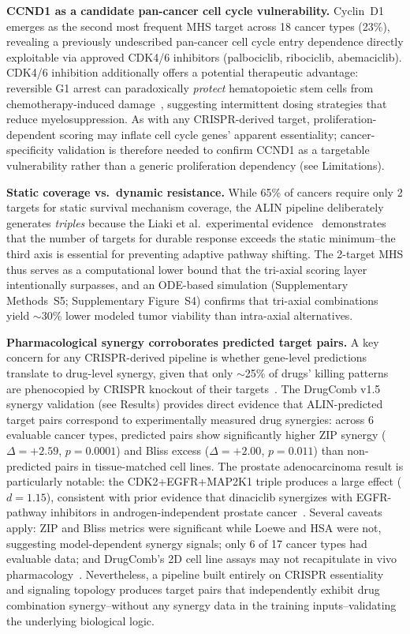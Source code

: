 \documentclass[times, twoside, watermark]{zHenriquesLab-StyleBioRxiv}
\begin{document}
\textbf{CCND1 as a candidate pan-cancer cell cycle vulnerability.} Cyclin~D1 emerges as the second most frequent MHS target across 18 cancer types (23\%), revealing a previously undescribed pan-cancer cell cycle entry dependence directly exploitable via approved CDK4/6 inhibitors (palbociclib, ribociclib, abemaciclib). CDK4/6 inhibition additionally offers a potential therapeutic advantage: reversible G1 arrest can paradoxically \emph{protect} hematopoietic stem cells from chemotherapy-induced damage~\cite{Roberts2012}, suggesting intermittent dosing strategies that reduce myelosuppression. As with any CRISPR-derived target, proliferation-dependent scoring may inflate cell cycle genes' apparent essentiality; cancer-specificity validation is therefore needed to confirm CCND1 as a targetable vulnerability rather than a generic proliferation dependency (see Limitations).

\textbf{Static coverage vs.\ dynamic resistance.} While 65\% of cancers require only 2 targets for static survival mechanism coverage, the ALIN pipeline deliberately generates \emph{triples} because the Liaki et al.\ experimental evidence~\cite{Liaki2025} demonstrates that the number of targets for durable response exceeds the static minimum--the third axis is essential for preventing adaptive pathway shifting. The 2-target MHS thus serves as a computational lower bound that the tri-axial scoring layer intentionally surpasses, and an ODE-based simulation (Supplementary Methods~S5; Supplementary Figure~S4) confirms that tri-axial combinations yield $\sim$30\% lower modeled tumor viability than intra-axial alternatives.

\textbf{Pharmacological synergy corroborates predicted target pairs.} A key concern for any CRISPR-derived pipeline is whether gene-level predictions translate to drug-level synergy, given that only $\sim$25\% of drugs' killing patterns are phenocopied by CRISPR knockout of their targets~\cite{Lin2017,Goncalves2020}. The DrugComb v1.5 synergy validation (see Results) provides direct evidence that ALIN-predicted target pairs correspond to experimentally measured drug synergies: across 6 evaluable cancer types, predicted pairs show significantly higher ZIP synergy ($\Delta = +2.59$, $p = 0.0001$) and Bliss excess ($\Delta = +2.00$, $p = 0.011$) than non-predicted pairs in tissue-matched cell lines. The prostate adenocarcinoma result is particularly notable: the CDK2+EGFR+MAP2K1 triple produces a large effect ($d = 1.15$), consistent with prior evidence that dinaciclib synergizes with EGFR-pathway inhibitors in androgen-independent prostate cancer~\cite{Nabhan2009}. Several caveats apply: ZIP and Bliss metrics were significant while Loewe and HSA were not, suggesting model-dependent synergy signals; only 6 of 17 cancer types had evaluable data; and DrugComb's 2D cell line assays may not recapitulate in vivo pharmacology~\cite{Zagidullin2019}. Nevertheless, a pipeline built entirely on CRISPR essentiality and signaling topology produces target pairs that independently exhibit drug combination synergy--without any synergy data in the training inputs--validating the underlying biological logic.
\end{document}
